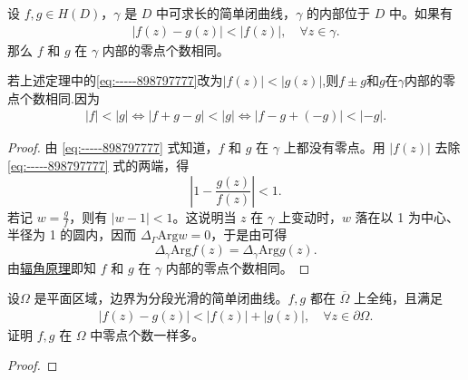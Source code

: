 \documentclass[../../main.tex]{subfiles}%
\begin{document}
\begin{theorem}[Rouché(鲁歇)定理]\label{theorem:Rouché定理-定理4.4.3}
设 \( f, g \in H(D) \)，\( \gamma \) 是 \( D \) 中可求长的简单闭曲线，\( \gamma \) 的内部位于 \( D \) 中。如果有
\begin{align}\label{eq:-----898797777}
|f(z) - g(z)| < |f(z)|,\quad \forall z\in \gamma.
\end{align}
那么 \( f \) 和 \( g \) 在 \( \gamma \) 内部的零点个数相同。
\end{theorem}
\begin{remark}
若上述定理中的\eqref{eq:-----898797777}改为$\left| f\left( z \right) \right|<\left| g\left( z \right) \right|$,则$f\pm g$和$g$在$\gamma $内部的零点个数相同.因为
\begin{align*}
\left| f \right|<\left| g \right|\Longleftrightarrow \left| f+g-g \right|<\left| g \right|\Longleftrightarrow \left| f-g+\left( -g \right) \right|<\left| -g \right|.
\end{align*}
\end{remark}
\begin{proof}

由 \eqref{eq:-----898797777} 式知道，\( f \) 和 \( g \) 在 \( \gamma \) 上都没有零点。用 \( |f(z)| \) 去除 \eqref{eq:-----898797777} 式的两端，得
\[
\left| 1 - \frac{g(z)}{f(z)} \right| < 1.
\]
若记 \( w = \frac{g}{f} \)，则有 \( |w - 1| < 1 \)。这说明当 \( z \) 在 \( \gamma \) 上变动时，\( w \) 落在以 1 为中心、半径为 1 的圆内，因而 \( \Delta_{\Gamma} \text{Arg} w = 0 \)，于是由可得
\[
\Delta_{\gamma} \text{Arg} f(z) = \Delta_{\gamma} \text{Arg} g(z).
\]
由\hyperref[theorem:辐角原理-定理4.4.2]{辐角原理}即知 \( f \) 和 \( g \) 在 \( \gamma \) 内部的零点个数相同。 

\end{proof}

\begin{corollary}\label{theorem:Rouché定理的对称形式}
设$\Omega$ 是平面区域，边界为分段光滑的简单闭曲线。$f,g$ 都在 $\overline{\Omega}$ 上全纯，且满足
\begin{align*}
|f(z)-g(z)| < |f(z)| + |g(z)|,\quad \forall z\in\partial\Omega.
\end{align*}
证明 $f,g$ 在 $\Omega$ 中零点个数一样多。
\end{corollary}
\begin{proof}


\end{proof}
\end{document}
